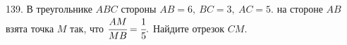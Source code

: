 139. В треугольнике $ABC$ стороны $AB=6,\ BC=3,\ AC=5.$ на стороне $AB$ взята точка $M$ так, что $\cfrac{AM}{MB}=\cfrac{1}{5}.$ Найдите отрезок $CM.$\\
